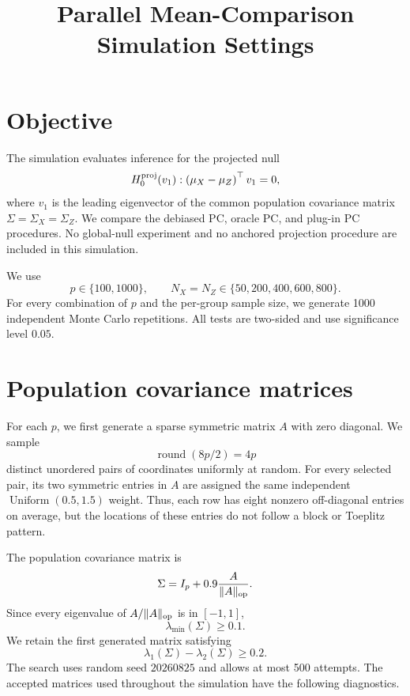 \documentclass[11pt]{article}
\title{Parallel Mean-Comparison Simulation Settings}
\author{}
\date{}
\begin{document}
\maketitle

\section{Objective}

The simulation evaluates inference for the projected null
\begin{equation}
H_0^{\rm proj}(v_1):
\left(\mu_X-\mu_Z\right)^\top v_1=0,
\label{eq:projected-null}
\end{equation}
where $v_1$ is the leading eigenvector of the common population covariance
matrix $\Sigma=\Sigma_X=\Sigma_Z$. We compare the debiased PC, oracle PC, and
plug-in PC procedures. No global-null experiment and no anchored projection
procedure are included in this simulation.

We use
\[
p\in\{100,1000\},
\qquad
N_X=N_Z\in\{50,200,400,600,800\}.
\]
For every combination of $p$ and the per-group sample size, we generate 1000
independent Monte Carlo repetitions. All tests are two-sided and use
significance level $0.05$.


\section{Population covariance matrices}

For each $p$, we first generate a sparse symmetric matrix $A$ with zero
diagonal. We sample
\[
\operatorname{round}(8p/2)=4p
\]
distinct unordered pairs of coordinates uniformly at random. For every
selected pair, its two symmetric entries in $A$ are assigned the same
independent $\operatorname{Uniform}(0.5,1.5)$ weight. Thus, each row has eight
nonzero off-diagonal entries on average, but the locations of these entries do
not follow a block or Toeplitz pattern.

The population covariance matrix is
\begin{equation}
\Sigma=I_p+0.9\frac{A}{\lVert A\rVert_{\rm op}}.
\label{eq:population-covariance}
\end{equation}
Since every eigenvalue of $A/\lVert A\rVert_{\rm op}$ is in $[-1,1]$,
\[
\lambda_{\min}(\Sigma)\geq 0.1.
\]
We retain the first generated matrix satisfying
\begin{equation}
\lambda_1(\Sigma)-\lambda_2(\Sigma)\geq 0.2.
\label{eq:population-gap-requirement}
\end{equation}
The search uses random seed $20260825$ and allows at most 500 attempts. The
accepted matrices used throughout the simulation have the following
diagnostics.
\end{document}
